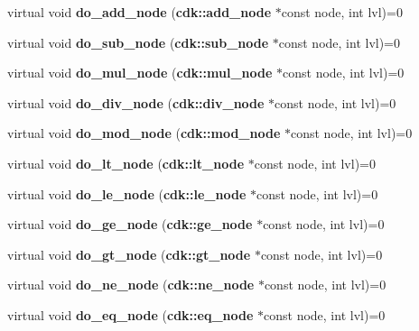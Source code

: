 \begin{DoxyCompactItemize}
\item 
virtual void {\bfseries do\+\_\+add\+\_\+node} ({\bf cdk\+::add\+\_\+node} $\ast$const node, int lvl)=0\label{classbasic__ast__visitor_acaf61e947882fe332740272a88d40dff}

\item 
virtual void {\bfseries do\+\_\+sub\+\_\+node} ({\bf cdk\+::sub\+\_\+node} $\ast$const node, int lvl)=0\label{classbasic__ast__visitor_ac22ba53376b0df09fcbce78030568d1b}

\item 
virtual void {\bfseries do\+\_\+mul\+\_\+node} ({\bf cdk\+::mul\+\_\+node} $\ast$const node, int lvl)=0\label{classbasic__ast__visitor_a7806c518f8fb3f9349b3b56a0ec266be}

\item 
virtual void {\bfseries do\+\_\+div\+\_\+node} ({\bf cdk\+::div\+\_\+node} $\ast$const node, int lvl)=0\label{classbasic__ast__visitor_abea4863f6219fb67e1841620d08a882d}

\item 
virtual void {\bfseries do\+\_\+mod\+\_\+node} ({\bf cdk\+::mod\+\_\+node} $\ast$const node, int lvl)=0\label{classbasic__ast__visitor_ad7ad0bac59f46e8a8eae65506973f3bb}

\item 
virtual void {\bfseries do\+\_\+lt\+\_\+node} ({\bf cdk\+::lt\+\_\+node} $\ast$const node, int lvl)=0\label{classbasic__ast__visitor_a1167e428d37a80936ebb6c99638c70ca}

\item 
virtual void {\bfseries do\+\_\+le\+\_\+node} ({\bf cdk\+::le\+\_\+node} $\ast$const node, int lvl)=0\label{classbasic__ast__visitor_a51d63c3b08b977f75ecef38dcd10f919}

\item 
virtual void {\bfseries do\+\_\+ge\+\_\+node} ({\bf cdk\+::ge\+\_\+node} $\ast$const node, int lvl)=0\label{classbasic__ast__visitor_a50cb4319b9ba03376fe567a92a0fb1ab}

\item 
virtual void {\bfseries do\+\_\+gt\+\_\+node} ({\bf cdk\+::gt\+\_\+node} $\ast$const node, int lvl)=0\label{classbasic__ast__visitor_a35d5c3dd16c3eec5797d67324608fd68}

\item 
virtual void {\bfseries do\+\_\+ne\+\_\+node} ({\bf cdk\+::ne\+\_\+node} $\ast$const node, int lvl)=0\label{classbasic__ast__visitor_adef6c9af687ca4c1a84d4e6b2f89f43c}

\item 
virtual void {\bfseries do\+\_\+eq\+\_\+node} ({\bf cdk\+::eq\+\_\+node} $\ast$const node, int lvl)=0\label{classbasic__ast__visitor_a28c9f578ae839fe555cd92615e8c2acb}

\end{DoxyCompactItemize}
